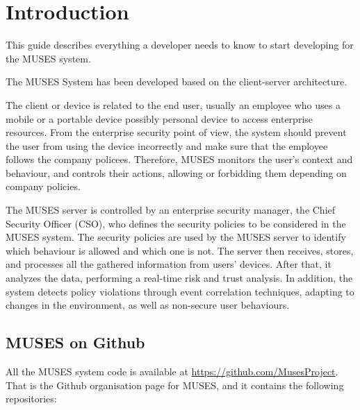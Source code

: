 \cleanlookdateon



\pagestyle{empty}

\titleGM %
\tableofcontents

\chapter{Introduction}
\label{ch:intro}

This guide describes everything a developer needs to know to start developing for the MUSES system.

The MUSES System \cite{deliverable21} has been developed based on the client-server architecture. 
 
The client or device is related to the end user, usually an employee who uses a mobile or a portable device possibly
personal device to access enterprise resources. From the enterprise security point of view, the system should prevent the user from using the device incorrectly and make sure that the employee follows the company policees. Therefore, MUSES monitors the user's context and behaviour, and controls their actions, allowing or forbidding them depending on company policies.

The MUSES server is controlled by an enterprise security manager, the Chief Security Officer (CSO), who defines the security policies to be considered in the MUSES system. The security policies are used by the MUSES server to identify which behaviour is allowed and which one is not. The server then receives, stores, and processes all the gathered information from users' devices. After that, it analyzes the data, performing a real-time risk and trust analysis. In addition, the system detects policy violations through event correlation techniques, adapting to changes in the environment, as well as non-secure user behaviours.

\section{MUSES on Github}
\label{sec:musesgit}

All the MUSES system code is available at \url{https://github.com/MusesProject}. That is the Github organisation page for MUSES, and it contains the following repositories:

